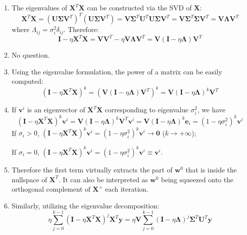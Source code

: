 \documentclass[a4paper, 10pt]{article}
\begin{document}
\begin{enumerate}[label=(\alph*)]
    \item The eigenvalues of $\mathbf{X}^T \mathbf{X}$ can be constructed via the SVD of $\mathbf{X}$:
    \begin{equation}
        \mathbf{X}^T \mathbf{X} = \left(\mathbf{U} \bm{\Sigma} \mathbf{V}^T\right)^T \left(\mathbf{U} \bm{\Sigma} \mathbf{V}^T\right) = \mathbf{V} \bm{\Sigma}^T \mathbf{U}^T \mathbf{U} \bm{\Sigma} \mathbf{V}^T = \mathbf{V} \bm{\Sigma}^T \bm{\Sigma} \mathbf{V}^T = \mathbf{V} \bm{\Lambda} \mathbf{V}^T
    \end{equation}
    where $\Lambda_{ij} = \sigma_i^2 \delta_{ij}$. Therefore:
    \begin{equation}
        \mathbf{I} - \eta \mathbf{X}^T \mathbf{X} = \mathbf{V}\mathbf{V}^T - \eta \mathbf{V} \bm{\Lambda} \mathbf{V}^T = \mathbf{V}\left(\mathbf{I} - \eta \bm{\Lambda}\right) \mathbf{V}^T
    \end{equation}
    
    \item No question.
    \item Using the eigenvalue formulation, the power of a matrix can be easily computed:
    \begin{equation}
        \left(\mathbf{I} - \eta \mathbf{X}^T \mathbf{X}\right)^k = \left(\mathbf{V}(\mathbf{I} - \eta \bm{\Lambda})\mathbf{V}^T\right)^k = \mathbf{V} (\mathbf{I} - \eta \bm{\Lambda})^k \mathbf{V}^T
    \end{equation}
    
    \item If $\mathbf{v}^i$ is an eigenvector of $\mathbf{X}^T \mathbf{X}$ corresponding to eigenvalue $\sigma_i^2$, we have
    \begin{equation}
        \left(\mathbf{I} - \eta \mathbf{X}^T \mathbf{X}\right)^k \mathbf{v}^i = \mathbf{V} \left(\mathbf{I} - \eta \bm{\Lambda}\right)^k \mathbf{V}^T \mathbf{v}^i = \mathbf{V}\left(\mathbf{I} - \eta \bm{\Lambda}\right)^k \mathbf{e}_i = (1 - \eta \sigma_i^2)^{k} \mathbf{v}^i
    \end{equation}
    If $\sigma_i > 0$, $\left(\mathbf{I} - \eta \mathbf{X}^T \mathbf{X}\right)^k \mathbf{v}^i = (1 - \eta \sigma_i^2)^{k} \mathbf{v}^i \rightarrow \mathbf{0}$ ($k \rightarrow +\infty$);
    
    If $\sigma_i = 0$, $\left(\mathbf{I} - \eta \mathbf{X}^T \mathbf{X}\right)^k \mathbf{v}^i = (1 - \eta \sigma_i^2)^{k} \mathbf{v}^i \equiv \mathbf{v}^i$.
    
    \item Therefore the first term virtually extracts the part of $\mathbf{w}^0$ that is inside the nullspace of $\mathbf{X}^T$. It can also be interpreted as $\mathbf{w}^0$ being squeezed onto the orthogonal complement of $\mathbf{X}^+$ each iteration.
    \item Similarly, utilizing the eigenvalue decomposition:
    \begin{equation}
        \eta \sum_{j=0}^{k-1}(\mathbf{I} - \eta \mathbf{X}^T \mathbf{X})^j \mathbf{X}^T \mathbf{y} = \eta \mathbf{V} \sum_{j=0}^{k-1}\left(\mathbf{I} - \eta \bm{\Lambda}\right)^j \bm{\Sigma}^T \mathbf{U}^T \mathbf{y}
    \end{equation}
    

\end{enumerate}
\end{document}
